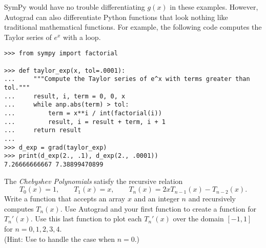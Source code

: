SymPy would have no trouble differentiating $g(x)$ in these examples.
However, Autograd can also differentiate Python functions that look nothing like traditional mathematical functions.
For example, the following code computes the Taylor series of $e^{x}$ with a loop.

\begin{lstlisting}
>>> from sympy import factorial

>>> def taylor_exp(x, tol=.0001):
...     """Compute the Taylor series of e^x with terms greater than tol."""
...     result, i, term = 0, 0, x
...     while anp.abs(term) > tol:
...         term = x**i / int(factorial(i))
...         result, i = result + term, i + 1
...     return result
...
>>> d_exp = grad(taylor_exp)
>>> print(d_exp(2., .1), d_exp(2., .0001))
7.26666666667 7.38899470899
\end{lstlisting}

\begin{problem} %
The \emph{Chebyshev Polynomials} satisfy the recursive relation
\[
T_0(x) = 1,\qquad T_1(x) = x,\qquad T_n(x) = 2xT_{n-1}(x) - T_{n-2}(x).
\]
Write a function that accepts an array $x$ and an integer $n$ and recursively computes $T_n(x)$.
Use Autograd and your first function to create a function for $T_n'(x)$.
Use this last function to plot each $T_n'(x)$ over the domain $[-1, 1]$ for $n=0,1,2,3,4$.
\\(Hint: Use  to handle the case when $n = 0$.)
\end{problem}

